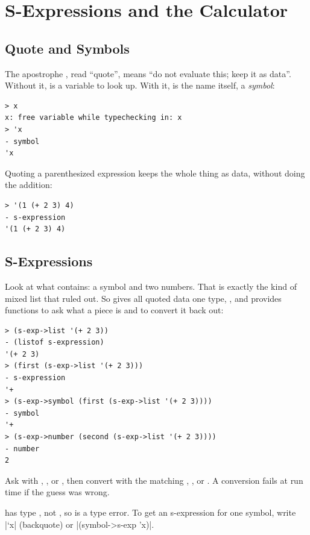 \section{S-Expressions and the Calculator}
\label{sec:calc}

\subsection{Quote and Symbols}

The apostrophe , read ``quote'', means ``do not evaluate this; keep it as data''. Without it,  is a variable to look up. With it,  is the name itself, a \emph{symbol}:
\begin{lstlisting}[style=repl]
> x
x: free variable while typechecking in: x
> 'x
- symbol
'x
\end{lstlisting}
Quoting a parenthesized expression keeps the whole thing as data, without doing the addition:
\begin{lstlisting}[style=repl]
> '(1 (+ 2 3) 4)
- s-expression
'(1 (+ 2 3) 4)
\end{lstlisting}

\subsection{S-Expressions}

Look at what  contains: a symbol and two numbers. That is exactly the kind of mixed list that  ruled out. So  gives all quoted data one type, , and provides functions to ask what a piece is and to convert it back out:
\begin{lstlisting}[style=repl]
> (s-exp->list '(+ 2 3))
- (listof s-expression)
'(+ 2 3)
> (first (s-exp->list '(+ 2 3)))
- s-expression
'+
> (s-exp->symbol (first (s-exp->list '(+ 2 3))))
- symbol
'+
> (s-exp->number (second (s-exp->list '(+ 2 3))))
- number
2
\end{lstlisting}

\begin{keypoint}
Ask with , , or , then convert with the matching , , or . A conversion fails at run time if the guess was wrong.
\end{keypoint}

\begin{pitfall}
 has type , not , so  is a type error. To get an s-expression for one symbol, write \rkt|`x| (backquote) or \rkt|(symbol->s-exp 'x)|.
\end{pitfall}

